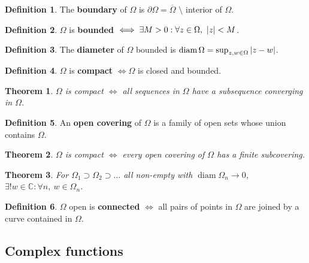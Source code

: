 \documentclass[12pt]{article}
\newtheorem{thm}{Theorem}[section]
\theoremstyle{definition}
\newtheorem{defn}{Definition}[section]
\newcommand{\C}{\mathbb{C}}
\DeclarePairedDelimiter\abs{\lvert}{\rvert}
\DeclareMathOperator{\diam}{diam}
\begin{document}
\begin{defn}
  The \textbf{boundary} of $\Omega$ is $\partial\Omega = \overline{\Omega}$ $\setminus$ interior of $\Omega$.
\end{defn}

\begin{defn}
  $\Omega$ is \textbf{bounded} $\iff \exists M > 0 : \forall z \in \Omega,\ \abs{z} < M$.
\end{defn}

\begin{defn}
  The \textbf{diameter} of $\Omega$ bounded is $\diam{\Omega} = \sup_{z, w \in \Omega}{\abs{z - w}}$.
\end{defn}

\begin{defn}
  $\Omega$ is \textbf{compact} $\iff \Omega$ is closed and bounded.
\end{defn}

\begin{thm}
  $\Omega$ is compact $\iff$ all sequences in $\Omega$ have a subsequence converging in $\Omega$.
\end{thm}

\begin{defn}
  An \textbf{open covering} of $\Omega$ is a family of open sets whose union contains $\Omega$.
\end{defn}

\begin{thm}
  $\Omega$ is compact $\iff$ every open covering of $\Omega$ has a finite subcovering.
\end{thm}

\begin{thm}
  For $\Omega_1 \supset \Omega_2 \supset \ldots$ all non-empty with $\diam{\Omega_n} \to 0$, $\exists! w \in \C : \forall n,\ w \in \Omega_n$.
\end{thm}

\begin{defn}
  $\Omega$ open is \textbf{connected} $\iff$ all pairs of points in $\Omega$ are joined by a curve contained in $\Omega$.
\end{defn}


\subsection{Complex functions}
\end{document}
